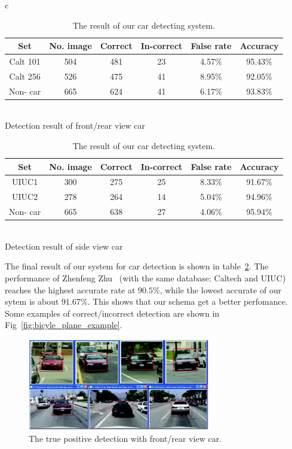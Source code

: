 \begin{table}[htbp]
\small
\begin{tabular}{c}%
   \begin{tabular}{|c|c|c|c|c|c|} \hline
	Set & No. image & Correct & In-correct & False rate & Accuracy \\ \hline
	Calt 101 & 504 & 481 & 23 & 4.57\% & 95.43\% \\ \hline
	Calt 256 & 526 & 475 & 41 & 8.95\% & 92.05\% \\ \hline
	Non- car & 665 & 624 & 41 & 6.17\% & 93.83\% \\ \hline
	\end{tabular} \\ %
	Detection result of front/rear view car \\ %
	\begin{tabular}{|c|c|c|c|c|c|} \hline	
	Set & No. image & Correct & In-correct & False rate & Accuracy \\ \hline
	UIUC1 & 300 & 275 & 25 & 8.33\% & 91.67\% \\ \hline
	UIUC2 & 278 & 264 & 14 & 5.04\% & 94.96\%  \\ \hline
	Non- car & 665 & 638 & 27 & 4.06\% & 95.94\% \\ \hline
	\end{tabular} \\ %
	Detection result of side view car \\ %
\end{tabular}
\caption{The result of our car detecting system.}
\label{table:car_detecting_result}
\end{table}
The final result of our system for car detection is shown in table~\ref{table:car_detecting_result}. The performance of Zhenfeng Zhu~\cite{zhu2004car} (with the same database: Caltech and UIUC) reaches the highest accurate rate at $90.5\%$, while
the lowest accurate of our sytem is about $91.67\%$. This shows that our schema get a better perfomance. Some examples of correct/incorrect detection are shown in Fig~\ref{fig:bicyle_plane_example}. 
\begin{figure}[ht]
  \centering
  \includegraphics[width=3.15in]{images/car_example.jpg}
  \caption{The true positive detection with front/rear view car.}
  \label{fig:car_example}
\end{figure}

